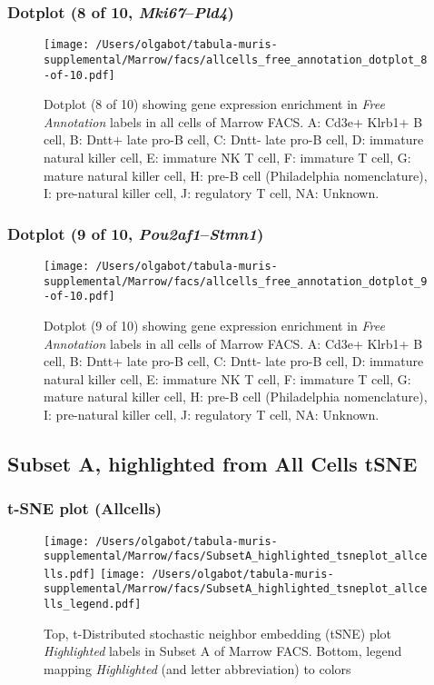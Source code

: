 \clearpage

\subsubsection{Dotplot (8 of 10, \emph{Mki67}--\emph{Pld4})}
\begin{figure}[h]
\centering
\texttt{[image: /Users/olgabot/tabula-muris-supplemental/Marrow/facs/allcells\_free\_annotation\_dotplot\_8-of-10.pdf]}

\caption{ Dotplot (8 of 10)  showing gene expression enrichment in \emph{Free Annotation} labels in all cells of Marrow FACS. A: Cd3e+ Klrb1+ B cell, B: Dntt+ late pro-B cell, C: Dntt- late pro-B cell, D: immature natural killer cell, E: immature NK T cell, F: immature T cell, G: mature natural killer cell, H: pre-B cell (Philadelphia nomenclature), I: pre-natural killer cell, J: regulatory T cell, NA: Unknown.}
\end{figure}


\clearpage

\subsubsection{Dotplot (9 of 10, \emph{Pou2af1}--\emph{Stmn1})}
\begin{figure}[h]
\centering
\texttt{[image: /Users/olgabot/tabula-muris-supplemental/Marrow/facs/allcells\_free\_annotation\_dotplot\_9-of-10.pdf]}

\caption{ Dotplot (9 of 10)  showing gene expression enrichment in \emph{Free Annotation} labels in all cells of Marrow FACS. A: Cd3e+ Klrb1+ B cell, B: Dntt+ late pro-B cell, C: Dntt- late pro-B cell, D: immature natural killer cell, E: immature NK T cell, F: immature T cell, G: mature natural killer cell, H: pre-B cell (Philadelphia nomenclature), I: pre-natural killer cell, J: regulatory T cell, NA: Unknown.}
\end{figure}


\clearpage
\subsection{Subset A, highlighted from All Cells tSNE}
\subsubsection{t-SNE plot (Allcells)}
\begin{figure}[h]
\centering
\texttt{[image: /Users/olgabot/tabula-muris-supplemental/Marrow/facs/SubsetA\_highlighted\_tsneplot\_allcells.pdf]}
\texttt{[image: /Users/olgabot/tabula-muris-supplemental/Marrow/facs/SubsetA\_highlighted\_tsneplot\_allcells\_legend.pdf]}
\caption{Top, t-Distributed stochastic neighbor embedding (tSNE) plot  \emph{Highlighted} labels in Subset A of Marrow FACS. Bottom, legend mapping \emph{Highlighted} (and letter abbreviation) to colors}
\end{figure}


